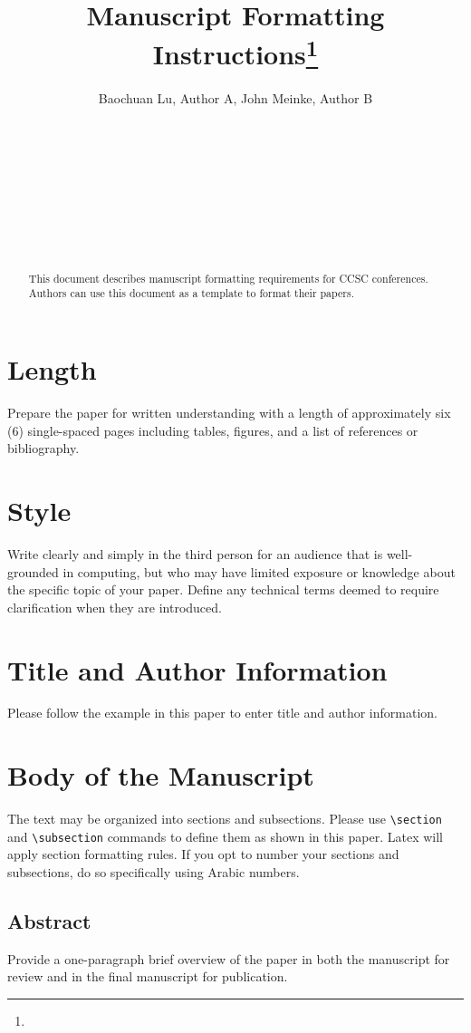 \documentclass{article}
\title{Manuscript Formatting Instructions\footnote{\protect}
}
\author{
Baochuan Lu\affmark[1], Author A\affmark[1], John Meinke\affmark[2], Author B\affmark[2]\\
\affaddr{\affmark[1]Computer and Information Sciences}\\
\affaddr{Southwest Baptist University}\\
\affaddr{Bolivar, MO 65613}\\
\email{\{blu,author\}@sbuniv.edu}\\
\affaddr{\affmark[2]Computer Science Department}\\
\affaddr{Another University}\\
\affaddr{Our Town, TX 00000}\\
\email{\{jmeinke,author\}@univ.edu}\\
}
\begin{document}
\maketitle

\begin{abstract}
This document describes manuscript formatting requirements for CCSC conferences. Authors can use this document as a template to format their papers.
\end{abstract}

\section{Length}
Prepare the paper for written understanding with a length of approximately six (6) single-spaced pages including tables, figures, and a list of references or bibliography.

\section{Style}
Write clearly and simply in the third person for an audience that is well-grounded in computing, but who may have limited exposure or knowledge about the specific topic of your paper. Define any technical terms deemed to require clarification when they are introduced.

\section{Title and Author Information}
Please follow the example in this paper to enter title and author information.

\section{Body of the Manuscript}
The text may be organized into sections and subsections. Please use \verb+\section+ and  \verb+\subsection+ commands to define them as shown in this paper. Latex will apply section formatting rules. If you opt to number your sections and subsections, do so specifically using Arabic numbers.

\subsection{Abstract}
Provide a one-paragraph brief overview of the paper in both the manuscript for review and in the final manuscript for publication.
\end{document}
